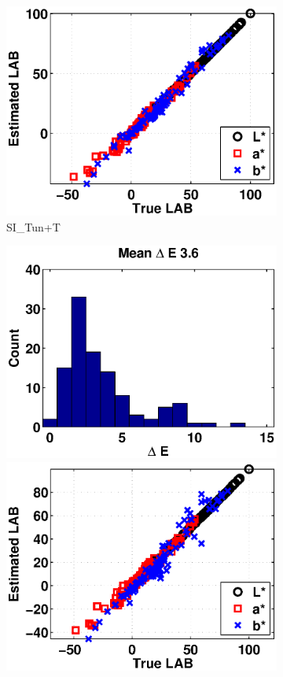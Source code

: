 \documentclass[]{spie}
\begin{document}
\begin{figure}
\begin{subfigure}[b]{0.325\textwidth}
    \includegraphics[width=\textwidth]{DeltaE_Tun}
    \caption{SI\_Tun+T}
\end{subfigure}
\begin{subfigure}[b]{0.325\textwidth}
    \includegraphics[width=\textwidth]{Hist_D65}
    \includegraphics[width=\textwidth]{DeltaE_D65}

\end{subfigure}
\end{figure}
\end{document}
